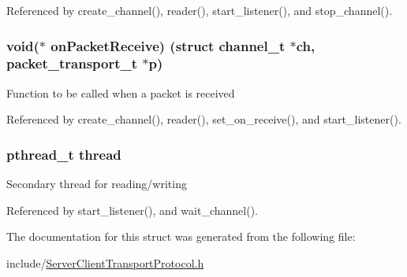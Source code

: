 Referenced by create\+\_\+channel(), reader(), start\+\_\+listener(), and stop\+\_\+channel().

\subsubsection[{\texorpdfstring{on\+Packet\+Receive}{onPacketReceive}}]{\setlength{\rightskip}{0pt plus 5cm}void($\ast$ on\+Packet\+Receive) (struct {\bf channel\+\_\+t} $\ast$ch, {\bf packet\+\_\+transport\+\_\+t} $\ast$p)}\hypertarget{structchannel__t_a26252193da2aaaaad1a401b6283d7736}{}\label{structchannel__t_a26252193da2aaaaad1a401b6283d7736}
Function to be called when a packet is received 

Referenced by create\+\_\+channel(), reader(), set\+\_\+on\+\_\+receive(), and start\+\_\+listener().

\subsubsection[{\texorpdfstring{thread}{thread}}]{\setlength{\rightskip}{0pt plus 5cm}pthread\+\_\+t thread}\hypertarget{structchannel__t_a01f75a9ad916f63a94e06a27635ba278}{}\label{structchannel__t_a01f75a9ad916f63a94e06a27635ba278}
Secondary thread for reading/writing 

Referenced by start\+\_\+listener(), and wait\+\_\+channel().



The documentation for this struct was generated from the following file\+:\begin{DoxyCompactItemize}
\item 
include/\hyperlink{_server_client_transport_protocol_8h}{Server\+Client\+Transport\+Protocol.\+h}\end{DoxyCompactItemize}
